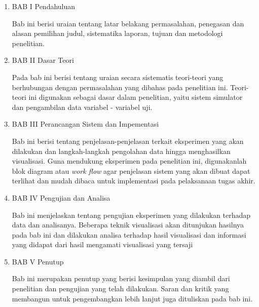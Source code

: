 \begin{enumerate}[nolistsep]
	\item BAB I Pendahuluan

	Bab ini berisi uraian tentang latar belakang permasalahan, penegasan dan alasan pemilihan judul, sistematika laporan, tujuan dan metodologi penelitian.
	\vspace{1ex}

	\item BAB II Dasar Teori

	Pada bab ini berisi tentang uraian secara sistematis teori-teori yang berhubungan dengan permasalahan yang dibahas pada penelitian ini. Teori-teori ini digunakan sebagai dasar dalam penelitian, yaitu sistem simulator dan pengambilan data variabel - variabel uji.
	\vspace{1ex}

	\item BAB III Perancangan Sistem dan Impementasi

	Bab ini berisi tentang penjelasan-penjelasan terkait eksperimen yang akan dilakukan dan langkah-langkah pengolahan data hingga menghasilkan visualisasi. Guna mendukung eksperimen pada penelitian ini, digunakanlah blok diagram atau \textit{work flow} agar penjelasan sistem yang akan dibuat dapat terlihat dan mudah dibaca untuk implementasi pada pelaksanaan tugas akhir.
	\vspace{1ex}

	\item BAB IV Pengujian dan Analisa

	Bab ini menjelaskan tentang pengujian eksperimen yang dilakukan terhadap data dan analisanya. Beberapa teknik visualisasi akan ditunjukan hasilnya pada bab ini dan dilakukan analisa terhadap hasil visualisasi dan informasi yang didapat dari hasil mengamati visualisasi yang tersaji
	\vspace{1ex}

	\item BAB V Penutup

	Bab ini merupakan penutup yang berisi kesimpulan yang diambil dari penelitian dan pengujian yang telah dilakukan. Saran dan kritik yang membangun untuk pengembangkan lebih lanjut juga dituliskan pada bab ini.
\end{enumerate}
\vspace{1ex}